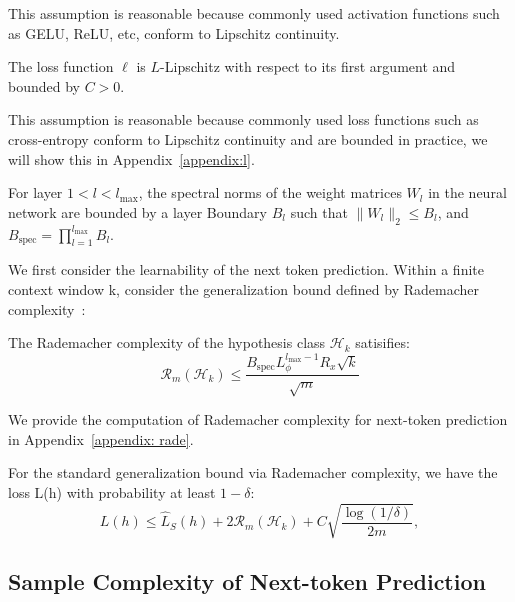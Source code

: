 This assumption is reasonable because commonly used activation functions such as GELU, ReLU, etc, conform to Lipschitz continuity. 

\begin{assumption} 
The loss function \( \ell \) is \( L \)-Lipschitz with respect to its first argument and bounded by \( C > 0 \).
\end{assumption}

{\color{black} This assumption is reasonable because commonly used loss functions such as cross-entropy conform to Lipschitz continuity and are bounded in practice, we will show this in Appendix~\ref{appendix:l}.}

\begin{assumption} 
For layer \( 1<l<l_{\text{max}} \), the spectral norms of the weight matrices \( W_l \) in the neural network are bounded by a layer Boundary \(B_l\) such that \( \| W_l \|_2 \leq B_l \), and \( B_{\text{spec}} = \prod_{l=1}^{l_{\text{max}}} B_l \).
    
\end{assumption}
We first consider the learnability of the next token prediction. Within a finite context window k, consider the generalization bound defined by Rademacher complexity~\citep{bartlett2002rademacher}:

\begin{lemma}\label{lemmarad}
The Rademacher complexity of the hypothesis class \( \mathcal{H}_k \) satisifies:
    \[ \mathcal{R}_m(\mathcal{H}_k) \leq \frac{B_{\text{spec}} L_{\phi}^{l_{\text{max}}-1} R_x \sqrt{k}}{\sqrt{m}} \]
\end{lemma}\label{generalization bound}
We provide the computation of Rademacher complexity for next-token prediction in Appendix~\ref{appendix: rade}.
\begin{lemma}
    For the standard generalization bound via Rademacher complexity, we have the loss L(h) with probability at least \( 1 - \delta \):
\[
L(h) \leq \hat{L}_S(h) + 2 \mathcal{R}_m(\mathcal{H}_k) + C \sqrt{\frac{\log(1/\delta)}{2m}},
\]
\end{lemma}

\subsection{Sample Complexity of Next-token Prediction}
 
